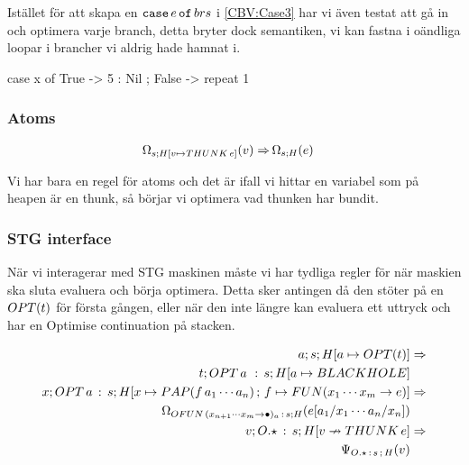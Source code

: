 \documentclass[../Optimise]{subfiles}
\begin{document}
Istället för att skapa en $\mathtt{case}\,e\,\mathtt{of}\,brs$ i \eqref{CBV:Case3} har vi även testat att gå in
och optimera varje branch, detta bryter dock semantiken, vi kan fastna
i oändliga loopar i brancher vi aldrig hade hamnat i. 

\begin{codeEx}
case x of
    { True  -> 5 : Nil
    ; False -> repeat 1
    }
\end{codeEx}

\subsubsection{Atoms}
\begin{align}
\Omega_{s;H[v\mapsto THUNK\,e]}(v) \Rightarrow &\, \Omega_{s;H}(e)
\end{align}

Vi har bara en regel för atoms och det är ifall vi hittar en variabel som på heapen
är en thunk, så börjar vi optimera vad thunken har bundit.

\subsubsection{STG interface}
När vi interagerar med STG maskinen måste vi har tydliga regler
för när maskien ska sluta evaluera och börja optimera. Detta sker
antingen då den stöter på en $OPT(t)$ för första gången, eller när den
inte längre kan evaluera ett uttryck och har en Optimise continuation
på stacken.

\begin{align}
a;s;H[a\mapsto OPT(t)] & \Rightarrow\\
t;OPT\,a\,\,:\,s;H[a\mapsto BLACKHOLE]\\
x;OPT\,a\,:\,s;H[x\mapsto PAP(f\,a_{1}\cdots a_{n})\,;\,f\mapsto FUN(x_{1}\cdots x_{m}\to e)] & \Rightarrow\\
\Omega_{OFUN\,(x_{n+1}\cdots x_{m}\to\bullet)_{a}\,:\,s;H}(e[a_{1}/x_{1}\cdots a_{n}/x_{n}])\\
v;O.\star\,:\, s;H[v\nrightarrow THUNK\,e] & \Rightarrow\\
\Psi_{O.\star\,:\, s\,;\,H}(v)
\end{align}
\end{document}
